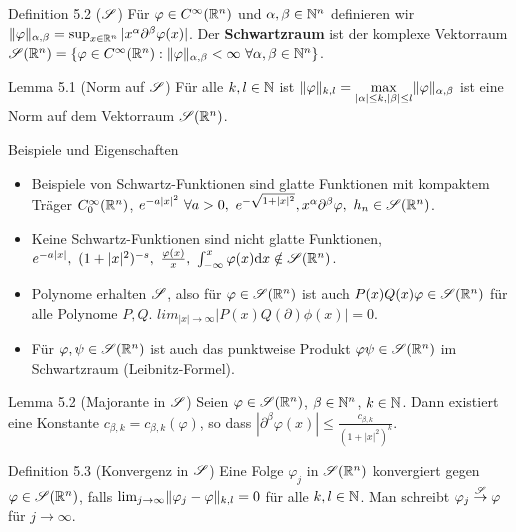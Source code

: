 \begin{namedtheorem}{Definition 5.2 ($\mathscr{S}$)}
  Für $\varphi\in C^{\infty}(\mathbb{R}^n)$ und $\alpha,\beta\in\mathbb{N}^n$ definieren wir $\lVert\varphi\rVert_{\alpha,\beta} = \sup_{x\in\mathbb{R}^n} |x^{\alpha} \partial^{\beta} \varphi(x)|$. Der \textbf{Schwartzraum} ist der komplexe Vektorraum $\mathscr{S}(\mathbb{R}^n) = \{\varphi\in C^{\infty}(\mathbb{R}^n): \lVert\varphi\rVert_{\alpha,\beta} < \infty\ \forall \alpha, \beta \in \mathbb{N}^n\}$.
\end{namedtheorem}

\begin{namedtheorem}{Lemma 5.1 (Norm auf $\mathscr{S}$)}
  Für alle $k,l\in\mathbb{N}$ ist $\lVert\varphi\rVert_{k,l} = \max\limits_{|\alpha|\leq k, |\beta|\leq l} \lVert\varphi\rVert_{\alpha,\beta}$ ist eine Norm auf dem Vektorraum $\mathscr{S}(\mathbb{R}^n)$.
\end{namedtheorem}

\begin{namedtheorem}{Beispiele und Eigenschaften}
  \hfill
  \begin{itemize}
    \item Beispiele von Schwartz-Funktionen sind glatte Funktionen mit kompaktem Träger $C^{\infty}_0(\mathbb{R}^n)$, $e^{-a|x|^2}\ \forall a>0,\ e^{-\sqrt{1+|x|^2}}, x^{\alpha}\partial^{\beta}\phi,\ h_n\in\Sr(\R^n)$.
    \item Keine Schwartz-Funktionen sind nicht glatte Funktionen, $e^{-a|x|},\ (1+|x|^2)^{-s},\ \frac{\phi(x)}{x},\ \int_{-\infty}^x\phi(x)\Dx\notin\Sr(\R^n)$. 
    \item Polynome erhalten $\mathscr{S}$, also für $\varphi\in\mathscr{S}(\mathbb{R}^n)$ ist auch $P(x)Q(x)\varphi\in\mathscr{S}(\mathbb{R}^n)$ für alle Polynome $P,Q$. $lim_{|x|\rightarrow\infty}|P(x)Q(\partial)\phi(x)|=0$.
    \item Für $\varphi,\psi\in\mathscr{S}(\mathbb{R}^n)$ ist auch das punktweise Produkt $\varphi\psi\in\mathscr{S}(\mathbb{R}^n)$ im Schwartzraum (Leibnitz-Formel).
  \end{itemize}
\end{namedtheorem}


\begin{namedtheorem}{Lemma 5.2 (Majorante in $\mathscr{S}$)}
  Seien $\varphi\in\mathscr{S}(\mathbb{R}^n)$, $\beta\in\mathbb{N}^n$, $k\in\mathbb{N}$. Dann existiert eine Konstante $c_{\beta,k} = c_{\beta,k}(\varphi)$, so dass $|\partial^{\beta} \varphi(x)| \leq \frac{c_{\beta,k}}{(1+|x|^2)^k}$.
\end{namedtheorem}


\begin{namedtheorem}{Definition 5.3 (Konvergenz in $\mathscr{S}$)}
  Eine Folge $\varphi_j$ in $\mathscr{S}(\mathbb{R}^n)$ konvergiert gegen $\varphi\in\mathscr{S}(\mathbb{R}^n)$, falls $\lim_{j\rightarrow\infty} \lVert\varphi_j-\varphi\rVert_{k,l} = 0$ für alle $k,l\in\mathbb{N}$. Man schreibt $\varphi_j \overset{\mathscr{S}}{\rightarrow}\varphi$ für $j\rightarrow\infty$.
\end{namedtheorem}

